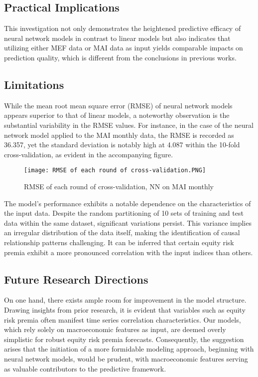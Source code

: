 \documentclass{article}
\begin{document}
\subsection{Practical Implications}

This investigation not only demonstrates the heightened predictive efficacy of neural network models in contrast to linear models but also indicates that utilizing either MEF data or MAI data as input yields comparable impacts on prediction quality, which is different from the conclusions in previous works.

\subsection{Limitations}

While the mean root mean square error (RMSE) of neural network models appears superior to that of linear models, a noteworthy observation is the substantial variability in the RMSE values. For instance, in the case of the neural network model applied to the MAI monthly data, the RMSE is recorded as 36.357, yet the standard deviation is notably high at 4.087 within the 10-fold cross-validation, as evident in the accompanying figure.
\begin{figure}[H]
    \centering \texttt{[image: RMSE of each round of cross-validation.PNG]}
    \caption{RMSE of each round of cross-validation, NN on MAI monthly}
\end{figure}
The model's performance exhibits a notable dependence on the characteristics of the input data. Despite the random partitioning of 10 sets of training and test data within the same dataset, significant variations persist. This variance implies an irregular distribution of the data itself, making the identification of causal relationship patterns challenging. It can be inferred that certain equity risk premia exhibit a more pronounced correlation with the input indices than others.

\subsection{Future Research Directions}

On one hand, there exists ample room for improvement in the model structure. Drawing insights from prior research, it is evident that variables such as equity risk premia often manifest time series correlation characteristics. Our models, which rely solely on macroeconomic features as input, are deemed overly simplistic for robust equity risk premia forecasts. Consequently, the suggestion arises that the initiation of a more formidable modeling approach, beginning with neural network models, would be prudent, with macroeconomic features serving as valuable contributors to the predictive framework.
\end{document}
